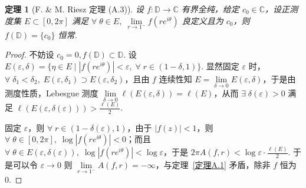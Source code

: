 \documentclass[11pt, a4paper, oneside]{ctexart}
\newtheorem{theorem}{定理}[section]
\newcommand{\C}{\mathbb{C}}
\newcommand{\D}{\mathbb{D}}
\newcommand{\abs}[1]{\left|{#1}\right|}
\begin{document}
    \begin{theorem}[F. \& M. Riesz 定理 (A.3)]\label{定理A.3}
        设 $f:\D\to \C$ 有界全纯，给定 $c_0\in\C$，设正测度集 $E\subset [0,2\pi]$ 满足 $\forall\; \theta\in E,\; \lim\limits_{r\to 1^-}f(re^{i\theta})$ 良定义且为 $c_0$，则 $f(\D)=\{c_0\}$ 恒常.
    \end{theorem}
    \begin{proof}
        不妨设 $c_0=0,f(\D)\subset \D$. 设 $E(\varepsilon,\delta)=\{\eta\in E\mid \abs{f(re^{i\theta})}<\varepsilon,\;\forall\; r\in (1-\delta,1)\}$. 显然固定 $\varepsilon$ 时，$\forall\; \delta_1<\delta_2,\;E(\varepsilon,\delta_1)\supset E(\varepsilon,\delta_2)$，且由 $f$ 连续性知 $E=\lim\limits_{\delta\to 0}E(\varepsilon,\delta)$，于是由测度性质，Lebesgue 测度 $\lim\limits_{\delta\to 0}\ell(E(\varepsilon,\delta))=\ell(E)$，从而 $\exists\;\delta(\varepsilon)>0$ 满足 $\ell(E(\varepsilon,\delta(\varepsilon)))>\frac{\ell(E)}{2}$.

        固定 $\varepsilon$，则 $\forall\; r\in (1-\delta(\varepsilon),1)$，由于 $\abs{f(z)}<1$，则 $\forall\;\theta\in [0,2\pi],\;\log\abs{f(re^{i\theta})}<0$；而且 $\forall\;\theta\in E(\varepsilon,\delta(\varepsilon)),\; \log\abs{f(re^{i\theta})}<\log\varepsilon$，于是 $2\pi A(f,r)<\log\varepsilon\cdot \frac{\ell(E)}{2}$. 于是可以令 $\varepsilon\to 0$ 则 $\lim\limits_{r\to 1^-}A(f,r)=-\infty$，与定理~\ref{定理A.1} 矛盾，除非 $f$ 恒为 $0$.
    \end{proof}
\end{document}
